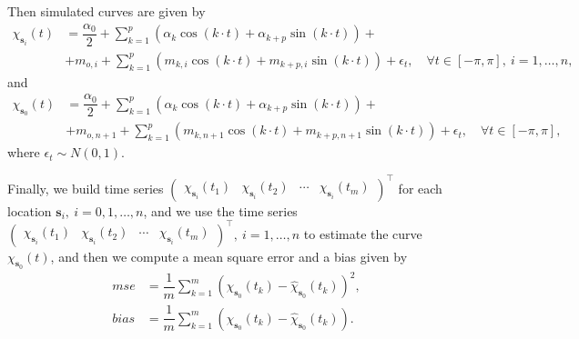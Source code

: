 \documentclass[12pt]{interact}
\theoremstyle{plain}%
\theoremstyle{definition}
\theoremstyle{remark}
\begin{document}
Then simulated curves are given by
\begin{align*}
\chi_{\bm{s}_i}(t) &= \dfrac{\alpha_0}{2} + \sum_{k=1}^{p}\left( \alpha_k \cos(k \cdot t) +\alpha_{k+p}\sin(k \cdot t) \right) +\\
&+m_{o,i} + \sum_{k=1}^{p} (m_{k,i}\cos(k\cdot t) + m_{k+p,i}\sin(k \cdot t)) + \epsilon_t, \quad \forall t \in [-\pi, \pi], \ i=1,\dots, n,
\end{align*}
and
\begin{align*}
\chi_{\bm{s}_0}(t) &= \dfrac{\alpha_0}{2} + \sum_{k=1}^{p}\left( \alpha_k \cos(k \cdot t) +\alpha_{k+p}\sin(k \cdot t) \right) +\\
&+m_{o,n+1} + \sum_{k=1}^{p} (m_{k,n+1}\cos(k\cdot t) + m_{k+p,n+1}\sin(k \cdot t)) + \epsilon_t, \quad \forall t \in [-\pi, \pi],
\end{align*}
where \(\epsilon_t \sim N(0,1)\).

Finally, we build time series \(\begin{pmatrix} \chi_{\bm{s}_i}(t_1) & \chi_{\bm{s}_i}(t_2) & \cdots & \chi_{\bm{s}_i}(t_m) \end{pmatrix}^\top\) for each location \(\bm{s}_i,\ i =0,1,\dots, n\), and we use the time series \(\begin{pmatrix} \chi_{\bm{s}_i}(t_1) & \chi_{\bm{s}_i}(t_2) & \cdots & \chi_{\bm{s}_i}(t_m) \end{pmatrix}^\top,\ i =1, \dots, n\) to estimate the curve \(\chi_{\bm{s}_0}(t)\), and then we compute a mean square error and a bias given by
\begin{align*}
mse &=   \dfrac{1}{m} \sum_{k=1}^{m} (\chi_{\bm{s}_0}(t_k) - \hat{\chi}_{\bm{s}_0}(t_k))^2,\\
bias &=   \dfrac{1}{m} \sum_{k=1}^{m} (\chi_{\bm{s}_0}(t_k) - \hat{\chi}_{\bm{s}_0}(t_k)).
\end{align*}
\end{document}
